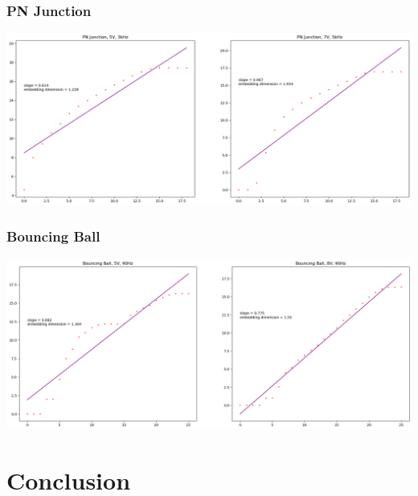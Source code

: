 \documentclass[9pt]{beamer}
\begin{document}
\begin{frame}
	\frametitle{PN Junction}

	\begin{center}
		\includegraphics[scale=0.23]{images/PN_info_dimension.png}
	\end{center}
\end{frame}

\begin{frame}
	\frametitle{Bouncing Ball} 

	\begin{center}
		\includegraphics[scale=0.23]{images/BB_info_dimension.png}
	\end{center}

\end{frame}

\section{Conclusion}
\end{document}
